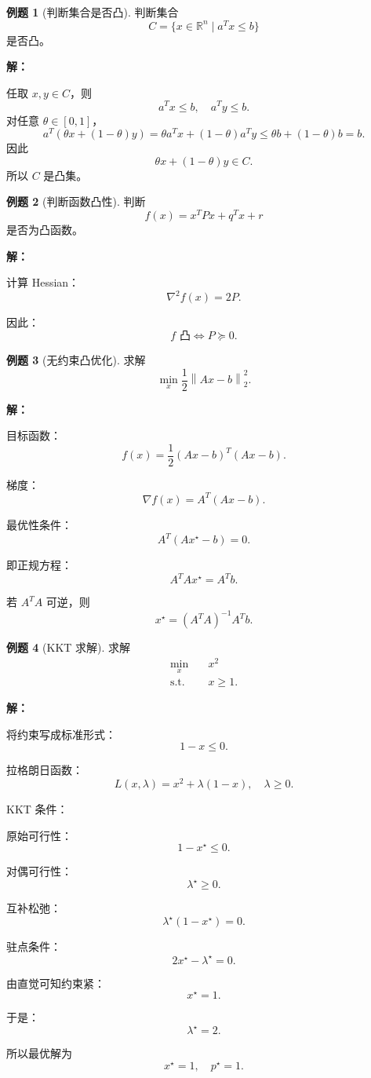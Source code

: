 \documentclass[11pt,a4paper]{ctexart}
\newcommand{\R}{\mathbb{R}}
\newcommand{\st}{\text{s.t.}}
\newcommand{\norm}[1]{\left\lVert #1 \right\rVert}
\theoremstyle{definition}
\newtheorem{example}{例题}[section]
\theoremstyle{plain}
\theoremstyle{remark}
\begin{document}
\begin{example}[判断集合是否凸]
判断集合
\[
    C=\{x\in\R^n\mid a^T x\le b\}
\]
是否凸。

\textbf{解：}

任取 $x,y\in C$，则
\[
    a^T x\le b,\quad a^T y\le b.
\]
对任意 $\theta\in[0,1]$，
\[
    a^T(\theta x+(1-\theta)y)
    =
    \theta a^Tx+(1-\theta)a^Ty
    \le
    \theta b+(1-\theta)b=b.
\]
因此
\[
    \theta x+(1-\theta)y\in C.
\]
所以 $C$ 是凸集。
\end{example}

\begin{example}[判断函数凸性]
判断
\[
    f(x)=x^T P x+q^T x+r
\]
是否为凸函数。

\textbf{解：}

计算 Hessian：
\[
    \nabla^2 f(x)=2P.
\]

因此：
\[
    f \text{ 凸}
    \Longleftrightarrow
    P\succeq0.
\]
\end{example}

\begin{example}[无约束凸优化]
求解
\[
    \min_x \frac12\norm{Ax-b}_2^2.
\]

\textbf{解：}

目标函数：
\[
    f(x)=\frac12(Ax-b)^T(Ax-b).
\]

梯度：
\[
    \nabla f(x)=A^T(Ax-b).
\]

最优性条件：
\[
    A^T(Ax^\star-b)=0.
\]

即正规方程：
\[
    A^T A x^\star=A^T b.
\]

若 $A^T A$ 可逆，则
\[
    x^\star=(A^T A)^{-1}A^T b.
\]
\end{example}

\begin{example}[KKT 求解]
求解
\[
\begin{aligned}
    \min_x\quad & x^2\\
    \st\quad & x\ge1.
\end{aligned}
\]

\textbf{解：}

将约束写成标准形式：
\[
    1-x\le0.
\]

拉格朗日函数：
\[
    L(x,\lambda)=x^2+\lambda(1-x),
    \quad \lambda\ge0.
\]

KKT 条件：

原始可行性：
\[
    1-x^\star\le0.
\]

对偶可行性：
\[
    \lambda^\star\ge0.
\]

互补松弛：
\[
    \lambda^\star(1-x^\star)=0.
\]

驻点条件：
\[
    2x^\star-\lambda^\star=0.
\]

由直觉可知约束紧：
\[
    x^\star=1.
\]

于是：
\[
    \lambda^\star=2.
\]

所以最优解为
\[
    x^\star=1,\quad p^\star=1.
\]
\end{example}
\end{document}
